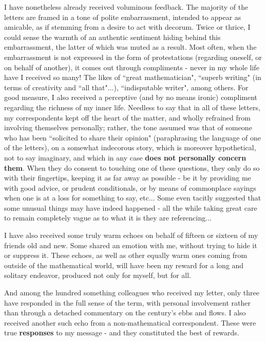 I have nonetheless already received voluminous feedback. The majority of the letters are framed in a tone of polite embarrassment, intended to appear as amicable, as if stemming from a desire to act with decorum. Twice or thrice, I could sense the warmth of an authentic sentiment hiding behind this embarrassment, the latter of which was muted as a result. Most often, when the embarrassment is not expressed in the form of protestations (regarding oneself, or on behalf of another), it comes out through compliments - never in my whole life have I received so many! The likes of ``great mathematician", ``superb writing" (in terms of creativity and ``all that"...), ``indisputable writer", among others. For good measure, I also received a perceptive (and by no means ironic) compliment regarding the richness of my inner life. Needless to say that in all of these letters, my correspondents kept off the heart of the matter, and wholly refrained from involving themselves personally; rather, the tone assumed was that of someone who has been ``solicited to share their opinion" (paraphrasing the language of one of the letters), on a somewhat indecorous story, which is moreover hypothetical, not to say imaginary, and which in any case \textbf{does not personally concern them}. When they do consent to touching one of these questions, they only do so with their fingertips, keeping it as far away as possible - be it by providing me with good advice, or prudent conditionals, or by means of commonplace sayings when one is at a loss for something to say, etc... Some even tacitly suggested that some unusual things may have indeed happened - all the while taking great care to remain completely vague as to what it is they are referencing...

I have also received some truly warm echoes on behalf of fifteen or sixteen of my friends old and new. Some shared an emotion with me, without trying to hide it or suppress it. These echoes, as well as other equally warm ones coming from outside of the mathematical world, will have been my reward for a long and solitary endeavor, produced not only for myself, but for all.

And among the hundred something colleagues who received my letter, only three have responded in the full sense of the term, with personal involvement rather than through a detached commentary on the century's ebbs and flows. I also received another such echo from a non-mathematical correspondent. These were true \textbf{responses} to my message - and they constituted the best of rewards.

